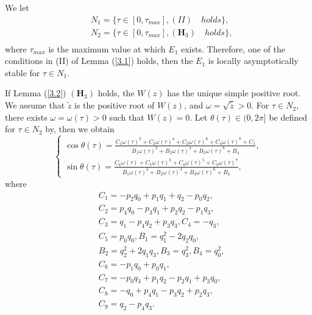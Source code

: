 \documentclass{CMHPhD-SIVD}
\begin{document}
We let
\begin{align*}
&N_1=\{\tau\in[0, \tau_{max}], (II) \quad holds\}, \\
&N_2=\{\tau\in[0, \tau_{max}], (\mathbf{H}_3) \quad holds\}, \\
\end{align*}
where $\tau_{max}$ is the maximum value at which $E_1$ exists. Therefore, one of the conditions in (II) of Lemma (\ref{3.1}) holds, then
the $E_1$ is locally asymptotically stable for $\tau\in N_1$.





If Lemma (\ref{3.2}) $(\mathbf{H}_3)$ holds, the $W(z)$ has the unique simple positive root. We assume that $\tilde{z}$ is the positive root of $W(z)$, and $\omega=\sqrt{\tilde{z}}>0$.  For $\tau \in N_2$, there exists $\omega = \omega(\tau) > 0$ such that $W(z) = 0$. Let $\theta(\tau)\in(0, 2\pi]$ be defined for $\tau\in N_2$ by, then we obtain
\begin{equation}\label{20}
\left\{
   \begin{array}{ll}
    \cos \theta(\tau)=\frac{C_1 \omega(\tau)^2 + C_2 \omega(\tau)^4 + C_3 \omega(\tau)^6 + C_4 \omega(\tau)^8+ C_5}{B_1 \omega(\tau)^2 + B_2 \omega(\tau)^4 +B_3 \omega(\tau)^6+ B_4},\\
    \sin \theta(\tau)=\frac{C_6 \omega(\tau) + C_7 \omega(\tau)^3 + C_8 \omega(\tau)^5+ C_9 \omega(\tau)^7}{B_1 \omega(\tau)^2 + B_2 \omega(\tau)^4 +B_3 \omega(\tau)^6+ B_4},
   \end{array}
\right.
\end{equation}
where
\begin{align*}
&C_1 = -p_2 q_0 +p_1 q_1 +q_2- 
p_0q_2,\\
&C_2 = p_4 q_0 -p_3 q_1 
+p_2q_2-p_1q_3, \\&C_3 = q_1-p_4q_2+p_3q_3,C_4 = -q_3,\\
&C_5 = p_0 q_0,B_1 = q_1^2 - 2q_2 q_0,\\
&B_2 =q_2^2+2q_1q_3,B_3 = q_3^2,B_4 = q_0^2,\\
&C_6 = -p_1 q_0 + p_0 q_1,\\
&C_7 = -p_0q_3+p_1 q_2 - p_2 q_1 +p_3 q_0,\\
&C_8 = -q_0+p_4 q_1 - p_3 q_2 +p_2 q_3,\\
&C_9= q_2 - p_4q_3.
\end{align*}
\end{document}
